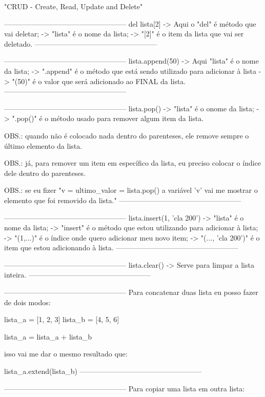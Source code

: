 "CRUD - Create, Read, Update and Delete"

---------------------------------------------------
del lista[2] 
-> Aqui o "del" é método que vai deletar;
-> "lista" é o nome da lista;
-> "[2]" é o item da lista que vai ser deletado.
---------------------------------------------------


---------------------------------------------------
lista.append(50)
-> Aqui "lista" é o nome da lista;
-> ".append" é o método que está sendo utilizado para adicionar à lista
-> "(50)" é o valor que será adicionado ao FINAL da lista.
---------------------------------------------------


---------------------------------------------------
lista.pop()
-> "lista" é o onome da lista;
-> ".pop()" é o método usado para remover algum item da lista.

OBS.: quando não é colocado nada dentro do parenteses, ele remove
sempre o último elemento da lista.

OBS.: já, para remover um item em específico da lista, eu preciso
colocar o índice dele dentro do parenteses.

OBS.: se eu fizer "v = ultimo_valor = lista.pop()
a variável 'v' vai me mostrar o elemento que foi removido da lista."
---------------------------------------------------


---------------------------------------------------
lista.insert(1, 'cla 200')
-> "lista" é o nome da lista;
-> "insert" é o método que estou utilizando para adicionar à lista;
-> "(1,...)" é o índice onde quero adicionar meu novo item;
-> "(..., 'cla 200')" é o item que estou adicionando à lista.
---------------------------------------------------


---------------------------------------------------
lista.clear()
-> Serve para limpar a lista inteira.
---------------------------------------------------


---------------------------------------------------
Para concatenar duas lista eu posso fazer de dois modos:

lista_a = [1, 2, 3]
lista_b = [4, 5, 6]

lista_a = lista_a + lista_b

isso vai me dar o mesmo resultado que:

lista_a.extend(lista_b)
---------------------------------------------------


---------------------------------------------------
Para copiar uma lista em outra lista:

